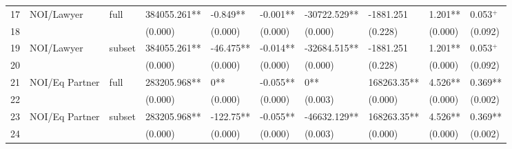 \documentclass{article}
\begin{document}
\begin{table}[H]
\begin{tabular}{rlllllllll}
  17 & NOI/Lawyer & full & 384055.261** & -0.849** & -0.001** & -30722.529** & -1881.251 & 1.201** & 0.053$^{+}$ \\
  18 &  &  & (0.000) & (0.000) & (0.000) & (0.000) & (0.228) & (0.000) & (0.092) \\
  19 & NOI/Lawyer & subset & 384055.261** & -46.475** & -0.014** & -32684.515** & -1881.251 & 1.201** & 0.053$^{+}$ \\
  20 &  &  & (0.000) & (0.000) & (0.000) & (0.000) & (0.228) & (0.000) & (0.092) \\
  21 & NOI/Eq Partner & full & 283205.968** & 0** & -0.055** & 0** & 168263.35** & 4.526** & 0.369** \\
  22 &  &  & (0.000) & (0.000) & (0.000) & (0.003) & (0.000) & (0.000) & (0.002) \\
  23 & NOI/Eq Partner & subset & 283205.968** & -122.75** & -0.055** & -46632.129** & 168263.35** & 4.526** & 0.369** \\
  24 &  &  & (0.000) & (0.000) & (0.000) & (0.003) & (0.000) & (0.000) & (0.002) \\
   \hline
\end{tabular}
\end{table}
\end{document}
